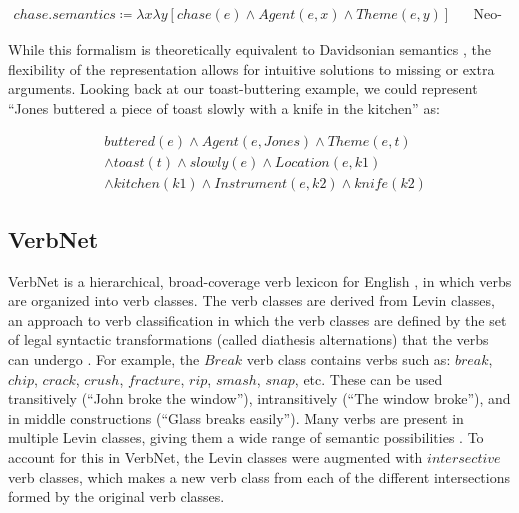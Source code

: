\documentclass[11pt,a4paper]{article}
\begin{document}
\begin{align}
chase.semantics \coloneqq \lambda x \lambda y \left[ chase(e) \land Agent(e,x) \land Theme(e, y) \right] && \text{Neo-Davidsonian}
\end{align}

While this formalism is theoretically equivalent to Davidsonian semantics
\cite{neodavidsonian}, the flexibility of the representation allows for
intuitive solutions to missing or extra arguments. Looking back at our toast-buttering 
example, we could represent ``Jones buttered a piece of toast slowly
with a knife in the kitchen'' as:

\begin{align*}
& buttered(e) \land Agent(e,Jones) \land Theme(e,t) \\
& \land toast(t) \land slowly(e) \land Location(e,k1) \\
& \land kitchen(k1) \land Instrument(e, k2) \land knife(k2)
\end{align*}

\subsection{VerbNet}

VerbNet is a hierarchical, broad-coverage verb lexicon for English
\cite{verbnet}, in which verbs are organized into verb classes. The verb classes
are derived from Levin classes, an approach to verb classification in which the
verb classes are defined by the set of legal syntactic transformations (called
diathesis alternations) that the verbs can undergo \cite{levin1993english}. For
example, the $Break$ verb class contains verbs such as: $break$, $chip$,
$crack$, $crush$, $fracture$, $rip$, $smash$, $snap$, etc. These can be used
transitively (``John broke the window''), intransitively (``The window broke''),
and in middle constructions (``Glass breaks easily''). Many verbs are present in
multiple Levin classes, giving them a wide range of semantic possibilities
\cite{verbnet}. To account for this in VerbNet, the Levin classes were augmented
with $intersective$ verb classes, which makes a new verb class from each of the
different intersections formed by the original verb classes.
\end{document}
